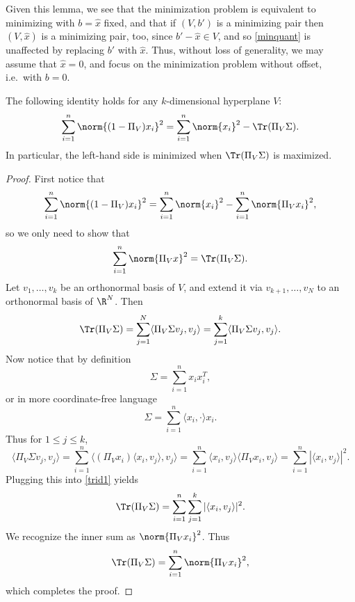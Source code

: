 \documentclass[12pt]{article}
\begin{document}
Given this lemma, we see that the minimization problem is equivalent to minimizing with $b = \hat{x}$ fixed, and that if $(V,b')$ is a minimizing pair then $(V,\hat{x})$ is a minimizing pair, too, since $b'-\hat{x} \in V$, and so \eqref{minquant} is unaffected by replacing $b'$ with $\hat{x}$. Thus, without loss of generality, we may assume that $\hat{x} = 0$, and focus on the minimization problem without offset, i.e.\ with $b=0$. 
 
 \begin{lem}The following identity holds for any $k$-dimensional hyperplane $V$:
 \[\sum_{i=1}^n \norm{(1-\Pi_V)x_i}^2 = \sum_{i=1}^n \norm{x_i}^2 - \Tr(\Pi_V \Sigma).\] In particular, the left-hand side is minimized when $\Tr(\Pi_V \Sigma)$ is maximized.\end{lem}
 \begin{proof}
 First notice that
 \[\sum_{i=1}^n \norm{(1-\Pi_V)x_i}^2 = \sum_{i=1}^n \norm{x_i}^2 - \sum_{i=1}^n \norm{\Pi_V x_i}^2,\] so we only need to show that
 \[\sum_{i=1}^n \norm{\Pi_V x}^2 = \Tr(\Pi_V \Sigma).\] Let $v_1,\ldots, v_k$ be an orthonormal basis of $V$, and extend it via $v_{k+1},\ldots,v_N$ to an orthonormal basis of $\R^N$. Then
 \begin{equation}\label{trid1}\Tr(\Pi_V \Sigma) = \sum_{j=1}^N \langle \Pi_V \Sigma v_j,v_j\rangle = \sum_{j=1}^k \langle \Pi_V \Sigma v_j,v_j\rangle.\end{equation} Now notice that by definition
 \[\Sigma = \sum_{i=1}^n x_ix_i^T,\] or in more coordinate-free language
 \[\Sigma = \sum_{i=1}^n \langle x_i,\cdot\rangle x_i.\] Thus for $1 \leq j \leq k$,
 \[\langle \Pi_V \Sigma v_j,v_j\rangle = \sum_{i=1}^n \langle (\Pi_V x_i) \langle x_i,v_j\rangle,v_j\rangle = \sum_{i=1}^n \langle x_i,v_j\rangle \langle \Pi_V x_i,v_j\rangle =  \sum_{i=1}^n |\langle x_i,v_j\rangle|^2.\] Plugging this into \eqref{trid1} yields
 \[\Tr(\Pi_V \Sigma) = \sum_{i=1}^n\sum_{j=1}^k |\langle x_i,v_j\rangle|^2.\] We recognize the inner sum as $\norm{\Pi_V x_i}^2$. Thus
 \[\Tr(\Pi_V \Sigma) = \sum_{i=1}^n\norm{\Pi_V x_i}^2,\] which completes the proof.
 \end{proof}
 
\end{document}
